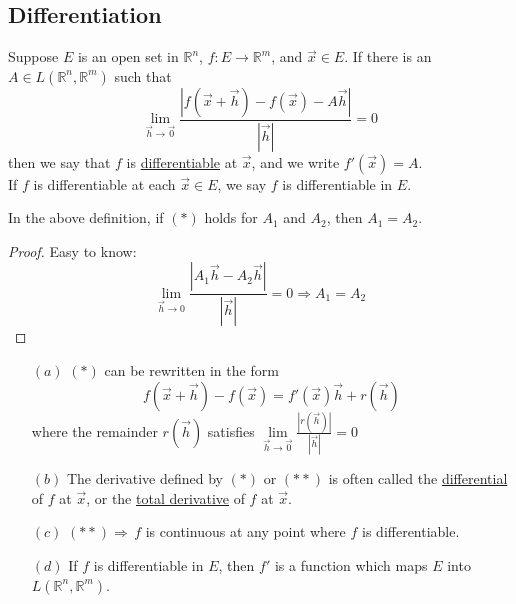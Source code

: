 \subsection{Differentiation}
Suppose  $ E  $ is an open set in  $ \mathbb{R }^n  $,  $ f:E \rightarrow \mathbb{R }^m $, and  $ \vec{x }\in E  $. If there is an  $ A\in L(\mathbb{R}^n ,\mathbb{R}^m) $ such that
\begin{equation}\tag{$ \ast $}
    \lim\limits_{\vec{h }\to \vec{0}}\frac{|f(\vec{x}+\vec{h})-f(\vec{x})-A\vec{h}|}{|\vec{h}|}=0 
\end{equation} 
then we say that  $ f  $ is \underline{differentiable} at  $ \vec{x} $, and we write  $ f'(\vec{x})=A $.\\
If  $ f  $ is differentiable at each  $ \vec{x}\in E  $, we say  $ f  $ is differentiable in  $ E  $.
\begin{theorem}
    In the above  definition, if  $ (\ast) $ holds for  $ A_1 $ and  $ A_2 $, then  $ A_1=A_2 $.
      
\end{theorem}      
\begin{proof}
    Easy to know:
    \[\lim\limits_{\vec{h }\rightarrow 0}\frac{|A_1\vec{h}-A_2\vec{h}|}{|\vec{h}|}=0\Rightarrow A_1=A_2  \]        
\end{proof} 
\begin{remark}
    \begin{enumerate}
        \item[$ (a) $]  $ (\ast) $ can be rewritten in the form  
        \begin{equation}\tag{$ \ast\ast $}
             f(\vec{x}+\vec{h})-f(\vec{x})=f'(\vec{x})\vec{h}+r(\vec{h})
        \end{equation}
        where the remainder  $ r(\vec{h}) $ satisfies  $ \lim\limits_{\vec{h }\to \vec{0 }}\frac{|r(\vec{h})|}{|\vec{h}|}=0   $ 
        \item[$ (b) $] The derivative defined by  $ (\ast) $ or $ (\ast\ast) $    is often called the \underline{differential }of  $ f  $ at  $ \vec{x} $, or the \underline{total derivative} of  $ f  $ at  $ \vec{x} $.
        \item[$ (c) $]  $ (\ast\ast)\Rightarrow\, f$ is continuous at any point where  $ f  $ is differentiable.
        \item[$ (d) $] If  $ f  $ is differentiable in  $ E  $, then  $ f' $ is a function which maps  $ E  $ into  $ L(\mathbb{R }^n,\mathbb{R }^m) $. 
    \end{enumerate}
\end{remark}